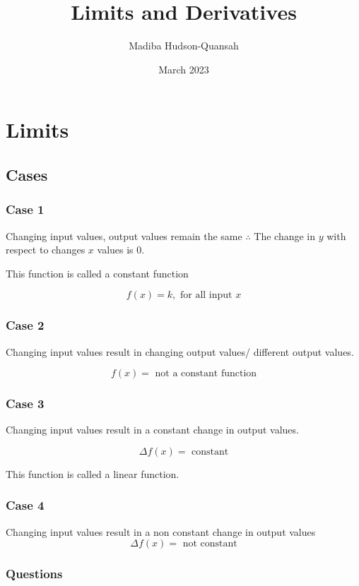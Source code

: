 \documentclass[12pt letter]{report}
\title{\Huge{Limits and Derivatives}}
\author{\huge{Madiba Hudson-Quansah}}
\date{March 2023}
\begin{document}
\maketitle
\newpage
{}
\tableofcontents
\pagebreak
{}
\chapter{Limits}
\section{Cases}

\subsection{Case 1}

Changing input values, output values remain the same $\therefore$ The change in $y$ with respect to changes $x$ values is $0$.

This function is called a constant function

\[
	f(x) = k, \text{ for all input } x
\]

\subsection{Case 2}

Changing input values result in changing output values/ different output values.

\[
	f(x) = \text{ not a constant function}
\]

\subsection{Case 3}

Changing input values result in a constant change in output values.

\[
	\Delta f(x) = \text{ constant}
\]

This function is called a linear function.

\subsection{Case 4}


Changing input values result in a non constant change in output values
\[
	\Delta f(x) = \text{ not constant}
\]

\pagebreak
\subsection{Questions}
\end{document}
